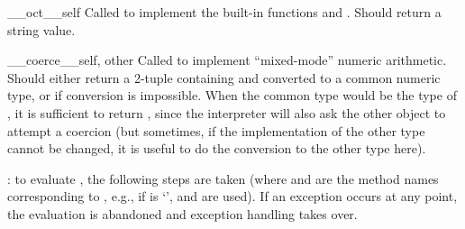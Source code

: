 \begin{methoddesc}{__oct__}{self}
Called to implement the built-in functions
 and
.  Should return a string value.
\end{methoddesc}

\begin{methoddesc}{__coerce__}{self, other}
Called to implement ``mixed-mode'' numeric arithmetic.  Should either
return a 2-tuple containing  and  converted to
a common numeric type, or  if conversion is impossible.  When
the common type would be the type of , it is sufficient to
return , since the interpreter will also ask the other
object to attempt a coercion (but sometimes, if the implementation of
the other type cannot be changed, it is useful to do the conversion to
the other type here).
\end{methoddesc}

: to evaluate   , the
following steps are taken (where  and
 are the method names corresponding to
, e.g., if  is `\code{+}',  and
 are used).  If an exception occurs at any point,
the evaluation is abandoned and exception handling takes over.

